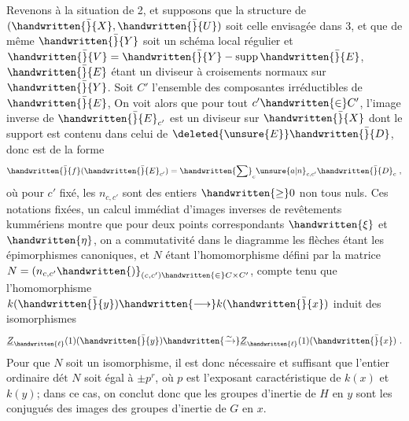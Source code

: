  Revenons à la situation de 2, et supposons que la structure de $(\handwritten{\bar}{X},\handwritten{\bar}{U})$ soit celle envisagée dans 3, et que de même $\handwritten{\bar}{Y}$ soit un schéma local régulier et $\handwritten{\bar}{V}=\handwritten{\bar}{Y}-\operatorname{supp}\handwritten{\bar}{E}$, $\handwritten{\bar}{E}$ étant un diviseur à croisements normaux sur $\handwritten{\bar}{Y}$. Soit $C'$ l'ensemble des composantes irréductibles de $\handwritten{\bar}{E}$, On voit alors que pour tout $c'\handwritten{\in}C'$, l'image inverse de $\handwritten{\bar}{E}_{c'}$ est un diviseur sur $\handwritten{\bar}{X}$ dont le support est contenu dans celui de $\deleted{\unsure{E}}\handwritten{\bar}{D}$, donc est de la forme
\[
\handwritten{\bar}{f}(\handwritten{\bar}{E}_{c'})=\handwritten{\sum}_{c}\unsure{a|n}_{c,c'}\handwritten{\bar}{D}_c\ ,
\]
où pour $c'$ fixé, les $n_{c,c'}$ sont des entiers $\handwritten{\geq}0$ non tous nuls. Ces notations fixées, un calcul immédiat  d'images inverses de revêtements kummériens montre que pour deux points correspondants $\handwritten{\xi}$ et $\handwritten{\eta}$,  on a commutativité dans le diagramme
les flèches  étant les épimorphismes canoniques, et $N$ étant l'homomorphisme défini par la matrice $N=(n_{c,c'}\handwritten{)}_{(c,c')\handwritten{\in}C\mathbin{\times}C'}$, compte tenu que l'homomorphisme $k(\handwritten{\bar}{y})\handwritten{\longrightarrow}k(\handwritten{\bar}{x})$ induit des isomorphismes
\[
\underline{Z}_{\handwritten{\ell}}(1)(\handwritten{\bar}{y})\handwritten{\xrightarrow{\sim}}\underline{Z}_{\handwritten{\ell}}(1)(\handwritten{\bar}{x})\ .
\]
Pour que  $N$ soit un isomorphisme, il est donc nécessaire et suffisant que   l'entier ordinaire $\text{dét }N$ soit égal à $\pm p^r$, où $p$ est l'exposant caractéristique de $k(x)$ et $k(y)$; dans ce cas, on conclut donc que les groupes d'inertie de $H$ en $y$ sont les conjugués des images des groupes d'inertie de $G$ en $x$.

